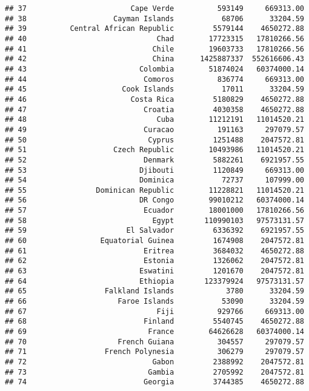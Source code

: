 \documentclass[
]{article}
\begin{document}
\begin{verbatim}
## 37                        Cape Verde          593149     669313.00
## 38                    Cayman Islands           68706      33204.59
## 39          Central African Republic         5579144    4650272.88
## 40                              Chad        17723315   17810266.56
## 41                             Chile        19603733   17810266.56
## 42                             China      1425887337  552616606.43
## 43                          Colombia        51874024   60374000.14
## 44                           Comoros          836774     669313.00
## 45                      Cook Islands           17011      33204.59
## 46                        Costa Rica         5180829    4650272.88
## 47                           Croatia         4030358    4650272.88
## 48                              Cuba        11212191   11014520.21
## 49                           Curacao          191163     297079.57
## 50                            Cyprus         1251488    2047572.81
## 51                    Czech Republic        10493986   11014520.21
## 52                           Denmark         5882261    6921957.55
## 53                          Djibouti         1120849     669313.00
## 54                          Dominica           72737     107999.00
## 55                Dominican Republic        11228821   11014520.21
## 56                          DR Congo        99010212   60374000.14
## 57                           Ecuador        18001000   17810266.56
## 58                             Egypt       110990103   97573131.57
## 59                       El Salvador         6336392    6921957.55
## 60                 Equatorial Guinea         1674908    2047572.81
## 61                           Eritrea         3684032    4650272.88
## 62                           Estonia         1326062    2047572.81
## 63                          Eswatini         1201670    2047572.81
## 64                          Ethiopia       123379924   97573131.57
## 65                  Falkland Islands            3780      33204.59
## 66                     Faroe Islands           53090      33204.59
## 67                              Fiji          929766     669313.00
## 68                           Finland         5540745    4650272.88
## 69                            France        64626628   60374000.14
## 70                     French Guiana          304557     297079.57
## 71                  French Polynesia          306279     297079.57
## 72                             Gabon         2388992    2047572.81
## 73                            Gambia         2705992    2047572.81
## 74                           Georgia         3744385    4650272.88

\end{verbatim}
\end{document}
